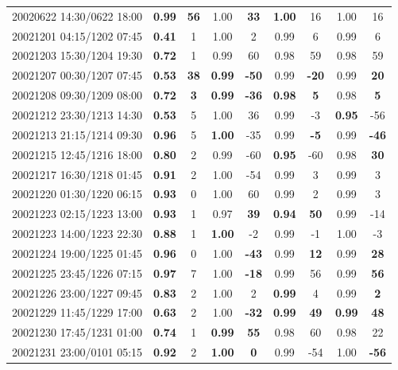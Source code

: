 \documentclass[linenumbers,draft]{agujournal}
\begin{document}
\begin{center}
\begin{longtable}{c||cc|cc|cc|cc}
20020622 14:30/0622 18:00 & \textbf{0.99} & \textbf{56} & 1.00 & \textbf{33} & \textbf{1.00} & 16 & 1.00 & 16 \\
20021201 04:15/1202 07:45 & \textbf{0.41} & 1 & 1.00 & 2 & 0.99 & 6 & 0.99 & 6 \\
20021203 15:30/1204 19:30 & \textbf{0.72} & 1 & 0.99 & 60 & 0.98 & 59 & 0.98 & 59 \\
20021207 00:30/1207 07:45 & \textbf{0.53} & \textbf{38} & \textbf{0.99} & \textbf{-50} & 0.99 & \textbf{-20} & 0.99 & \textbf{20} \\
20021208 09:30/1209 08:00 & \textbf{0.72} & \textbf{3} & \textbf{0.99} & \textbf{-36} & \textbf{0.98} & \textbf{5} & 0.98 & \textbf{5} \\
20021212 23:30/1213 14:30 & \textbf{0.53} & 5 & 1.00 & 36 & 0.99 & -3 & \textbf{0.95} & -56 \\
20021213 21:15/1214 09:30 & \textbf{0.96} & 5 & \textbf{1.00} & -35 & 0.99 & \textbf{-5} & 0.99 & \textbf{-46} \\
20021215 12:45/1216 18:00 & \textbf{0.80} & 2 & 0.99 & -60 & \textbf{0.95} & -60 & 0.98 & \textbf{30} \\
20021217 16:30/1218 01:45 & \textbf{0.91} & 2 & 1.00 & -54 & 0.99 & 3 & 0.99 & 3 \\
20021220 01:30/1220 06:15 & \textbf{0.93} & 0 & 1.00 & 60 & 0.99 & 2 & 0.99 & 3 \\
20021223 02:15/1223 13:00 & \textbf{0.93} & 1 & 0.97 & \textbf{39} & \textbf{0.94} & \textbf{50} & 0.99 & -14 \\
20021223 14:00/1223 22:30 & \textbf{0.88} & 1 & \textbf{1.00} & -2 & 0.99 & -1 & 1.00 & -3 \\
20021224 19:00/1225 01:45 & \textbf{0.96} & 0 & 1.00 & \textbf{-43} & 0.99 & \textbf{12} & 0.99 & \textbf{28} \\
20021225 23:45/1226 07:15 & \textbf{0.97} & 7 & 1.00 & \textbf{-18} & 0.99 & 56 & 0.99 & \textbf{56} \\
20021226 23:00/1227 09:45 & \textbf{0.83} & 2 & 1.00 & 2 & \textbf{0.99} & 4 & 0.99 & \textbf{2} \\
20021229 11:45/1229 17:00 & \textbf{0.63} & 2 & 1.00 & \textbf{-32} & \textbf{0.99} & \textbf{49} & \textbf{0.99} & \textbf{48} \\
20021230 17:45/1231 01:00 & \textbf{0.74} & 1 & \textbf{0.99} & \textbf{55} & 0.98 & 60 & 0.98 & 22 \\
20021231 23:00/0101 05:15 & \textbf{0.92} & 2 & \textbf{1.00} & \textbf{0} & 0.99 & -54 & 1.00 & \textbf{-56} \\

\end{longtable}
\end{center}
\end{document}
